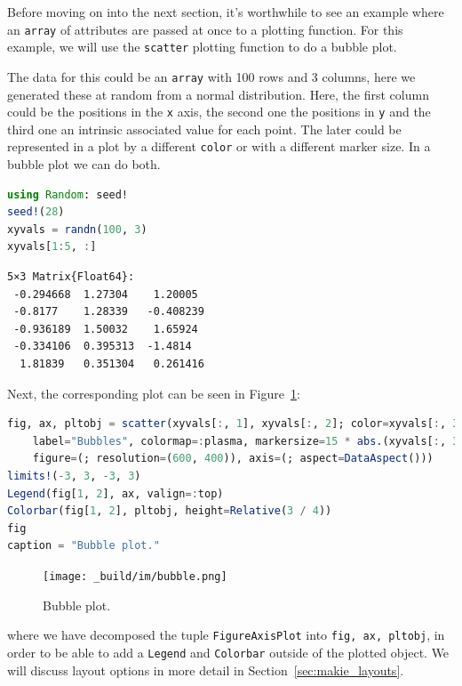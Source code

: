 \documentclass[
  notoc %
]{tufte-book}
\newcommand{\passthrough}[1]{#1}
\begin{document}
Before moving on into the next section, it's worthwhile to see an
example where an \passthrough{\lstinline!array!} of attributes are
passed at once to a plotting function. For this example, we will use the
\passthrough{\lstinline!scatter!} plotting function to do a bubble plot.

The data for this could be an \passthrough{\lstinline!array!} with 100
rows and 3 columns, here we generated these at random from a normal
distribution. Here, the first column could be the positions in the
\passthrough{\lstinline!x!} axis, the second one the positions in
\passthrough{\lstinline!y!} and the third one an intrinsic associated
value for each point. The later could be represented in a plot by a
different \passthrough{\lstinline!color!} or with a different marker
size. In a bubble plot we can do both.

\begin{lstlisting}[language=Julia]
using Random: seed!
seed!(28)
xyvals = randn(100, 3)
xyvals[1:5, :]
\end{lstlisting}

\begin{lstlisting}[language=Output]
5×3 Matrix{Float64}:
 -0.294668  1.27304    1.20005
 -0.8177    1.28339   -0.408239
 -0.936189  1.50032    1.65924
 -0.334106  0.395313  -1.4814
  1.81839   0.351304   0.261416
\end{lstlisting}

Next, the corresponding plot can be seen in Figure~\ref{fig:bubble}:

\begin{lstlisting}[language=Julia]
fig, ax, pltobj = scatter(xyvals[:, 1], xyvals[:, 2]; color=xyvals[:, 3],
    label="Bubbles", colormap=:plasma, markersize=15 * abs.(xyvals[:, 3]),
    figure=(; resolution=(600, 400)), axis=(; aspect=DataAspect()))
limits!(-3, 3, -3, 3)
Legend(fig[1, 2], ax, valign=:top)
Colorbar(fig[1, 2], pltobj, height=Relative(3 / 4))
fig
caption = "Bubble plot."
\end{lstlisting}

\begin{figure}
\hypertarget{fig:bubble}{%
\centering
\texttt{[image: \_build/im/bubble.png]}
\caption{Bubble plot.}\label{fig:bubble}
}
\end{figure}

where we have decomposed the tuple
\passthrough{\lstinline!FigureAxisPlot!} into
\passthrough{\lstinline!fig, ax, pltobj!}, in order to be able to add a
\passthrough{\lstinline!Legend!} and \passthrough{\lstinline!Colorbar!}
outside of the plotted object. We will discuss layout options in more
detail in Section~\ref{sec:makie_layouts}.
\end{document}
